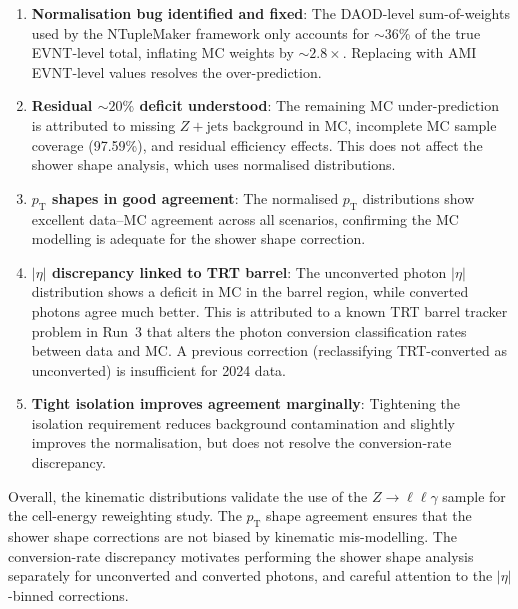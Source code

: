 \documentclass[11pt,a4paper]{article}
\newcommand{\pT}{\ensuremath{p_{\mathrm{T}}}\xspace}
\newcommand{\abseta}{\ensuremath{|\eta|}\xspace}
\newcommand{\Zllg}{\ensuremath{Z \to \ell\ell\gamma}\xspace}
\begin{document}
\begin{enumerate}
  \item \textbf{Normalisation bug identified and fixed}:
    The DAOD-level sum-of-weights used by the NTupleMaker framework only
    accounts for ${\sim}36\%$ of the true EVNT-level total, inflating MC
    weights by ${\sim}2.8\times$.  Replacing with AMI EVNT-level values
    resolves the over-prediction.

  \item \textbf{Residual ${\sim}20\%$ deficit understood}:
    The remaining MC under-prediction is attributed to missing
    $Z{+}\text{jets}$ background in MC, incomplete MC sample coverage
    (97.59\%), and residual efficiency effects.  This does not affect
    the shower shape analysis, which uses normalised distributions.

  \item \textbf{$\pT$ shapes in good agreement}:
    The normalised $\pT$ distributions show excellent data--MC agreement
    across all scenarios, confirming the MC modelling is adequate for the
    shower shape correction.

  \item \textbf{$\abseta$ discrepancy linked to TRT barrel}:
    The unconverted photon $\abseta$ distribution shows a deficit in MC
    in the barrel region, while converted photons agree much better. This is
    attributed to a known TRT barrel tracker problem in Run~3 that alters
    the photon conversion classification rates between data and MC.  A
    previous correction (reclassifying TRT-converted as unconverted) is
    insufficient for 2024 data.

  \item \textbf{Tight isolation improves agreement marginally}:
    Tightening the isolation requirement reduces background contamination
    and slightly improves the normalisation, but does not resolve the
    conversion-rate discrepancy.
\end{enumerate}

Overall, the kinematic distributions validate the use of the $\Zllg$
sample for the cell-energy reweighting study.  The $\pT$ shape agreement
ensures that the shower shape corrections are not biased by kinematic
mis-modelling.  The conversion-rate discrepancy motivates performing the
shower shape analysis separately for unconverted and converted photons,
and careful attention to the $\abseta$-binned corrections.
\end{document}
